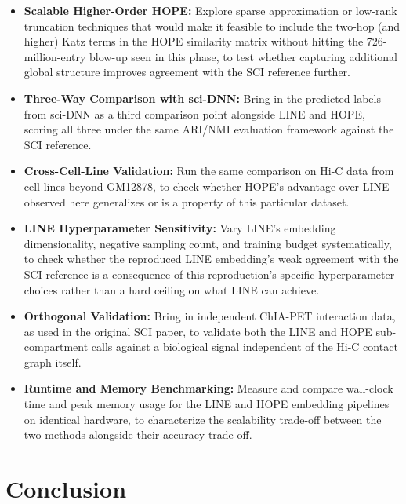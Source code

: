 \documentclass[12pt]{article}
\begin{document}
\begin{itemize}
    \item \textbf{Scalable Higher-Order HOPE:} Explore sparse approximation or low-rank
    truncation techniques that would make it feasible to include the two-hop (and higher) Katz
    terms in the HOPE similarity matrix without hitting the 726-million-entry blow-up seen in
    this phase, to test whether capturing additional global structure improves agreement with
    the SCI reference further.

    \item \textbf{Three-Way Comparison with sci-DNN:} Bring in the predicted labels from sci-DNN
    as a third comparison point alongside LINE and HOPE, scoring all three under the same
    ARI/NMI evaluation framework against the SCI reference.

    \item \textbf{Cross-Cell-Line Validation:} Run the same comparison on Hi-C data from cell
    lines beyond GM12878, to check whether HOPE's advantage over LINE observed here generalizes
    or is a property of this particular dataset.

    \item \textbf{LINE Hyperparameter Sensitivity:} Vary LINE's embedding dimensionality, negative
    sampling count, and training budget systematically, to check whether the reproduced LINE
    embedding's weak agreement with the SCI reference is a consequence of this reproduction's
    specific hyperparameter choices rather than a hard ceiling on what LINE can achieve.

    \item \textbf{Orthogonal Validation:} Bring in independent ChIA-PET interaction data, as used
    in the original SCI paper, to validate both the LINE and HOPE sub-compartment calls against a
    biological signal independent of the Hi-C contact graph itself.

    \item \textbf{Runtime and Memory Benchmarking:} Measure and compare wall-clock time and peak
    memory usage for the LINE and HOPE embedding pipelines on identical hardware, to characterize
    the scalability trade-off between the two methods alongside their accuracy trade-off.
\end{itemize}

\section{Conclusion}
\end{document}

